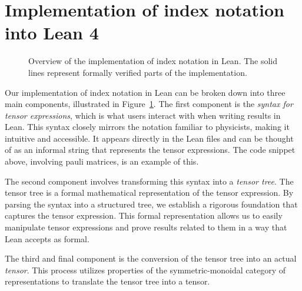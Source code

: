 \documentclass[a4paper, 11pt]{article}
\begin{document}
\section{Implementation of index notation into Lean 4}\label{sec:Implementation}
\begin{figure}
  \centering
  \caption{Overview of the implementation of index notation in Lean. The 
  solid lines represent formally verified parts of the implementation.}
  \label{fig:overviewFlow}
\end{figure}
Our implementation of index notation in Lean can be  broken down into 
three main components, illustrated in Figure~\ref{fig:overviewFlow}. 
The first component is the \emph{syntax for tensor expressions}, 
which is what users interact with when writing results in Lean. 
This syntax closely mirrors the notation familiar to physicists, 
making it intuitive and accessible. 
It appears directly in the Lean files and can be thought of as an informal string 
that represents the tensor expressions. The code snippet above, involving pauli matrices, is an 
example of this.

The second component involves transforming this syntax into a \emph{tensor tree}. 
The tensor tree is a formal mathematical representation of the tensor expression. 
By parsing the syntax into a structured tree, 
we establish a rigorous foundation that captures the tensor expression. 
This formal representation allows us to easily manipulate tensor expressions and
prove results related to them in a way that Lean accepts as formal.

The third and final component is the conversion of the tensor tree into an actual \emph{tensor}. 
This process utilizes properties of the symmetric-monoidal category of representations
 to translate the tensor tree into a tensor.
\end{document}
